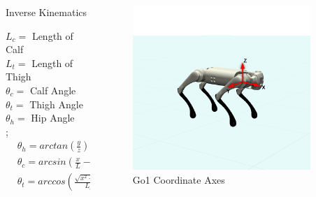 \documentclass{beamer}
\begin{document}
\begin{frame}
    \begin{columns}[T]
        \begin{column}{.55\textwidth}
         \begin{block}{Inverse Kinematics}

            $L_c = $ Length of Calf \\
            $L_t =$ Length of Thigh \\
            $\theta_c=$ Calf Angle \\
            $\theta_t=$ Thigh Angle \\
            $\theta_h =$ Hip Angle \\
            ;\ \\
            \begin{align*}
                &\theta_h = arctan(\frac{y}{z})\\
                &\theta_c = arcsin(\frac{x}{L} - sin(\theta_t)) - \theta_t \\
                &\theta_t = arccos(\frac{\sqrt{x^2 + y^2 + z^2}}{L_t + L_c}) + arctan(\frac{-x}{\sqrt{y^2 + z^2}}) \\
            \end{align*}

        \end{block}
        \end{column}
        \begin{column}{.45\textwidth}
        \begin{block}{}
        \begin{figure}
            \includegraphics[width=0.9\textwidth, height=0.5\textheight]{../images/coords_fix.png}
            \caption{Go1 Coordinate Axes}
        \end{figure}
        \end{block}
        \end{column}
      \end{columns}

\end{frame}
\end{document}
